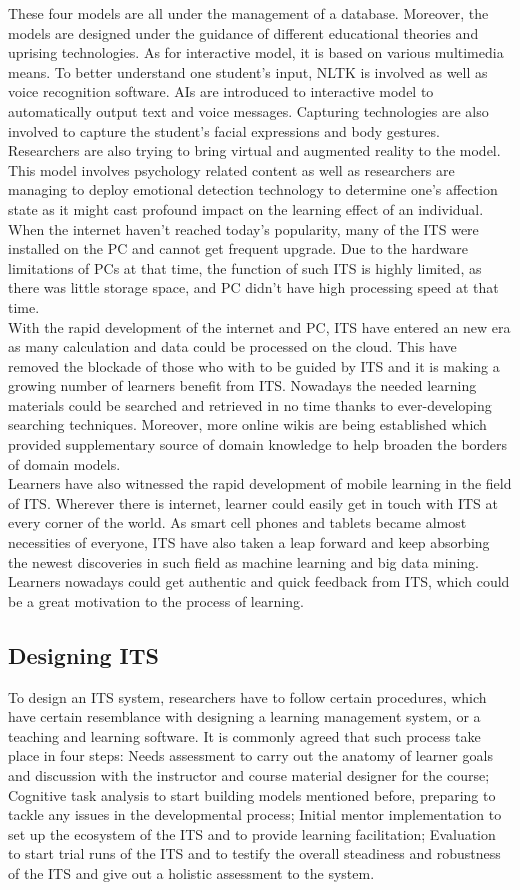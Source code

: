 \documentclass[sigconf]{acmart}
\begin{document}
These four models are all under the management of a database. Moreover, the models are designed under the guidance of different educational theories and uprising technologies. As for interactive model, it is based on various multimedia means. To better understand one student's input, NLTK is involved as well as voice recognition software. AIs are introduced to interactive model to automatically output text and voice messages. Capturing technologies are also involved to capture the student's facial expressions and body gestures. Researchers are also trying to bring virtual and augmented reality to the model. This model involves psychology related content as well as researchers are managing to deploy emotional detection technology to determine one's affection state as it might cast profound impact on the learning effect of an individual.\\
When the internet haven't reached today's popularity, many of the ITS were installed on the PC and cannot get frequent upgrade. Due to the hardware limitations of PCs at that time, the function of such ITS is highly limited, as there was little storage space, and PC didn't have high processing speed at that time\cite{Gray1998}. \\
With the rapid development of the internet and PC, ITS have entered an new era as many calculation and data could be processed on the cloud. This have removed the blockade of those who with to be guided by ITS and it is making a growing number of learners benefit from ITS. Nowadays the needed learning materials could be searched and retrieved in no time thanks to ever-developing searching techniques. Moreover, more online wikis are being established which provided supplementary source of domain knowledge to help broaden the borders of domain models.\\
Learners have also witnessed the rapid development of mobile learning in the field of ITS. Wherever there is internet, learner could easily get in touch with ITS at every corner of the world. As smart cell phones and tablets became almost necessities of everyone, ITS have also taken a leap forward and keep absorbing the newest discoveries in such field as machine learning and big data mining. Learners nowadays could get authentic and quick feedback from ITS, which could be a great motivation to the process of learning.\\
\subsection{Designing ITS}
To design an ITS system, researchers have to follow certain procedures, which have certain resemblance with designing a learning management system, or a teaching and learning software.
It is commonly agreed that such process take place in four steps: Needs assessment to carry out the anatomy of learner goals and discussion with the instructor and course material designer for the course; Cognitive task analysis to start building models mentioned before, preparing to tackle any issues in the developmental process; Initial mentor implementation to set up the ecosystem of the ITS and to provide learning facilitation; Evaluation to start trial runs of the ITS and to testify the overall steadiness and robustness of the ITS and give out a holistic assessment to the system.
\end{document}
